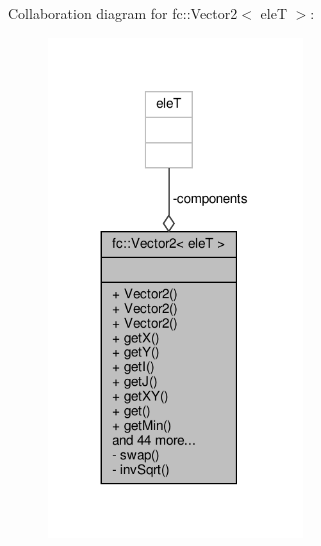 Collaboration diagram for fc\+:\+:Vector2$<$ eleT $>$\+:
\nopagebreak
\begin{figure}[H]
\begin{center}
\leavevmode
\includegraphics[width=191pt]{d8/d33/classfc_1_1Vector2__coll__graph}
\end{center}
\end{figure}
